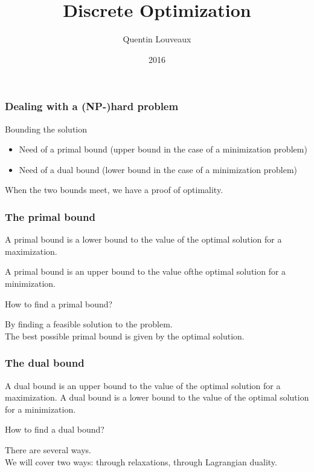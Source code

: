 \documentclass[9pt]{beamer}
\title{Discrete Optimization}
\author{Quentin
Louveaux}
\institute{ULg - Institut Montefiore}
\date{2016}
\begin{document}
\begin{frame}
  \titlepage
\end{frame}
\begin{frame}
\frametitle{Dealing with a (NP-)hard problem}
\begin{block}{Bounding the solution}
\begin{itemize}
\item<1-> Need of a \alert{primal bound} (upper bound in the case of a minimization problem)\medskip
\item<1-> Need of a \alert{dual bound} (lower bound in the case of a minimization problem)\medskip
\end{itemize}
When the two bounds \alert{meet}, we have a proof of \alert{optimality}.
\end{block}
\end{frame}
\begin{frame}
\frametitle{The primal bound}
A \alert{primal bound} is a \alert{lower bound} to the value of the optimal solution for a maximization.\medskip

A \alert{primal bound} is an \alert{upper bound} to the value ofthe  optimal solution for a minimization.\bigskip

How to find a primal bound?\bigskip

By finding a \alert{feasible solution} to the problem.\\
The best possible primal bound is given by the \alert{optimal solution}.
\end{frame}
\begin{frame}
\frametitle{The dual bound}
A \alert{dual bound} is an \alert{upper bound} to the value of the  optimal solution for a maximization.\medskip
A \alert{dual bound} is a \alert{lower bound} to the value of the  optimal solution for a minimization.\bigskip

How to find a dual bound?\bigskip

There are several ways.\\
We will cover two ways: through \alert{relaxations}, through \alert{Lagrangian duality}.
\end{frame}
\end{document}
